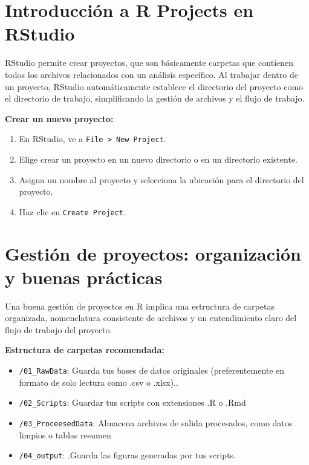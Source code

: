 \documentclass[
]{book}
\providecommand{\tightlist}{%
  \setlength{\itemsep}{0pt}\setlength{\parskip}{0pt}}
\begin{document}
\section{Introducción a R Projects en RStudio}\label{introducciuxf3n-a-r-projects-en-rstudio}

RStudio permite crear proyectos, que son básicamente carpetas que contienen todos los archivos relacionados con un análisis específico. Al trabajar dentro de un proyecto, RStudio automáticamente establece el directorio del proyecto como el directorio de trabajo, simplificando la gestión de archivos y el flujo de trabajo.

\textbf{Crear un nuevo proyecto:}

\begin{enumerate}
\def\labelenumi{\arabic{enumi}.}
\tightlist
\item
  En RStudio, ve a \texttt{File\ \textgreater{}\ New\ Project}.
\item
  Elige crear un proyecto en un nuevo directorio o en un directorio existente.
\item
  Asigna un nombre al proyecto y selecciona la ubicación para el directorio del proyecto.
\item
  Haz clic en \texttt{Create\ Project}.
\end{enumerate}

\section{Gestión de proyectos: organización y buenas prácticas}\label{gestiuxf3n-de-proyectos-organizaciuxf3n-y-buenas-pruxe1cticas}

Una buena gestión de proyectos en R implica una estructura de carpetas organizada, nomenclatura consistente de archivos y un entendimiento claro del flujo de trabajo del proyecto.

\textbf{Estructura de carpetas recomendada:}

\begin{itemize}
\tightlist
\item
  \texttt{/01\_RawData}: Guarda tus bases de datos originales (preferentemente en formato de solo lectura como .csv o .xlsx)..
\item
  \texttt{/02\_Scripts}: Guardar tus scripts con extensiones .R o .Rmd
\item
  \texttt{/03\_ProceesedData}: Almacena archivos de salida procesados, como datos limpios o tablas resumen
\item
  \texttt{/04\_output}: .Guarda las figuras generadas por tus scripts.
\end{itemize}
\end{document}
